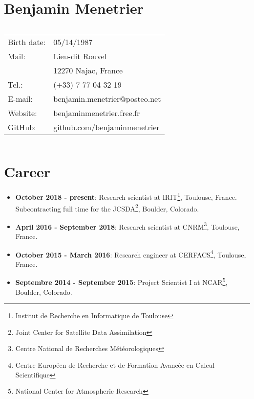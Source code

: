 \documentclass[a4paper,9pt]{scrreprt}
\begin{document}
\section*{{\huge Benjamin Menetrier}}
$  $\\
$  $\\
\large
\begin{tabular}{ll}
Birth date: & 05/14/1987 \\
Mail: &  Lieu-dit Rouvel\\
  & 12270 Najac, France \\
Tel.: & (+33) 7 77 04 32 19 \\
E-mail: & benjamin.menetrier@posteo.net \\
Website: & benjaminmenetrier.free.fr \\
GitHub: & github.com/benjaminmenetrier
\end{tabular}
$  $\\
\begin{center}
{\vrule depth 0pt height 0.4pt width 8cm}
\end{center}

\section*{Career}
\begin{itemize}
\item \textbf{October 2018 - present}: Research scientist at IRIT\footnote{Institut de Recherche en Informatique de Toulouse}, Toulouse, France. Subcontracting full time for the JCSDA\footnote{Joint Center for Satellite Data Assimilation}, Boulder, Colorado.\vspace{-0.1cm}
\item \textbf{April 2016 - September 2018}: Research scientist at CNRM\footnote{Centre National de Recherches Météorologiques}, Toulouse, France.\vspace{-0.1cm}
\item \textbf{October 2015 - March 2016}: Research engineer at CERFACS\footnote{Centre Européen de Recherche et de Formation Avancée en Calcul Scientifique}, Toulouse, France.\vspace{-0.1cm}
\item \textbf{Septembre 2014 - September 2015}: Project Scientist I at NCAR\footnote{National Center for Atmospheric Research}, Boulder, Colorado.
\end{itemize}
\end{document}
